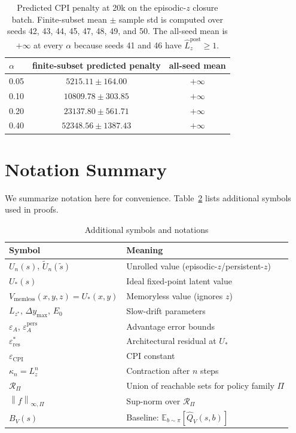\documentclass{article}
\theoremstyle{plain}
\theoremstyle{definition}
\theoremstyle{remark}
\newcommand{\E}{\mathbb{E}}
\newcommand{\supnorm}[2]{\left\| #1 \right\|_{\infty,#2}}
\begin{document}
\begin{table}[t]
\caption{Predicted CPI penalty at 20k on the episodic-$z$ closure batch. Finite-subset mean $\pm$ sample std is computed over seeds 42, 43, 44, 45, 47, 48, 49, and 50. The all-seed mean is $+\infty$ at every $\alpha$ because seeds 41 and 46 have $\hat L_z^{\mathrm{post}}\ge 1$.}
\label{tab:episodic_z_penalty}
\centering
\small
\begin{tabular}{@{}lcc@{}}
\toprule
$\alpha$ & finite-subset predicted penalty & all-seed mean \\
\midrule
0.05 & $5215.11 \pm 164.00$ & $+\infty$ \\
0.10 & $10809.78 \pm 303.85$ & $+\infty$ \\
0.20 & $23137.80 \pm 561.71$ & $+\infty$ \\
0.40 & $52348.56 \pm 1387.43$ & $+\infty$ \\
\bottomrule
\end{tabular}
\end{table}

\section{Notation Summary}
\label{app:notation}

We summarize notation here for convenience.
Table~\ref{tab:notation} lists additional symbols used in proofs.

\begin{table}[t]
\caption{Additional symbols and notations}
\label{tab:notation}
\begin{center}
\begin{tabular}{ll}
\toprule
Symbol & Meaning \\
\midrule
$U_n(s)$, $\tilde U_n(\tilde s)$ & Unrolled value (episodic-$z$/persistent-$z$) \\
$U_*(s)$ & Ideal fixed-point latent value \\
$V_{\mathrm{memless}}(x,y,z) = U_*(x,y)$ & Memoryless value (ignores $z$) \\
$L_{z^*}$, $\Delta y_{\max}$, $E_0$ & Slow-drift parameters \\
$\varepsilon_A$, $\varepsilon_A^{\mathrm{pers}}$ & Advantage error bounds \\
$\varepsilon_{\mathrm{res}}^*$ & Architectural residual at $U_*$ \\
$\varepsilon_{\mathrm{CPI}}$ & CPI constant \\
$\kappa_n = L_z^n$ & Contraction after $n$ steps \\
$\mathcal{R}_\Pi$ & Union of reachable sets for policy family $\Pi$ \\
$\supnorm{f}{\Pi}$ & Sup-norm over $\mathcal{R}_\Pi$ \\
$B_V(s)$ & Baseline: $\E_{b \sim \pi}[\widehat{Q}_V(s,b)]$ \\
\bottomrule
\end{tabular}
\end{center}
\end{table}
\end{document}
